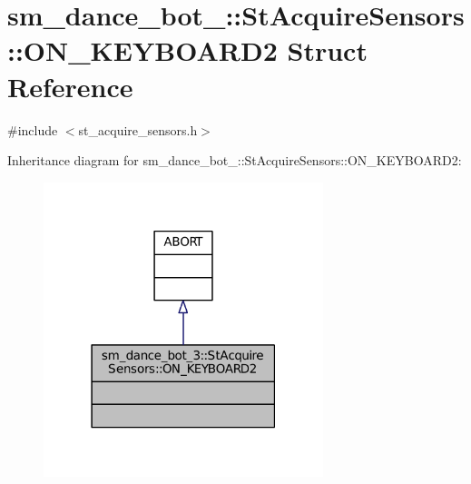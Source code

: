 \hypertarget{structsm__dance__bot__3_1_1StAcquireSensors_1_1ON__KEYBOARD2}{}\section{sm\+\_\+dance\+\_\+bot\+\_\+:\+:St\+Acquire\+Sensors\+:\+:O\+N\+\_\+\+K\+E\+Y\+B\+O\+A\+R\+D2 Struct Reference}
\label{structsm__dance__bot__3_1_1StAcquireSensors_1_1ON__KEYBOARD2}


{\ttfamily \#include $<$st\+\_\+acquire\+\_\+sensors.\+h$>$}



Inheritance diagram for sm\+\_\+dance\+\_\+bot\+\_\+:\+:St\+Acquire\+Sensors\+:\+:O\+N\+\_\+\+K\+E\+Y\+B\+O\+A\+R\+D2\+:
\nopagebreak
\begin{figure}[H]
\begin{center}
\leavevmode
\includegraphics[width=231pt]{structsm__dance__bot__3_1_1StAcquireSensors_1_1ON__KEYBOARD2__inherit__graph}
\end{center}
\end{figure}


